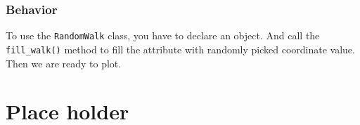 \documentclass[12pt]{book}
\begin{document}
\section{Behavior}
\label{sec:org4233b35}
To use the \texttt{RandomWalk} class, you have to declare an object. And call the \texttt{fill\_walk()} method to fill the attribute with randomly picked coordinate value. Then we are ready to plot.

\part{Place holder}
\label{sec:org115b780}
\end{document}
